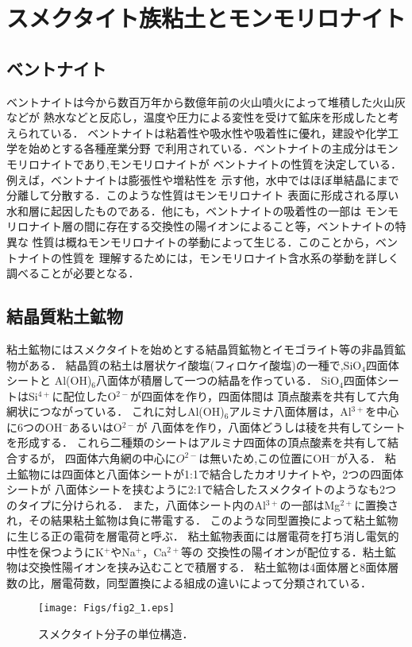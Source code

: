 ﻿\chapter{スメクタイト族粘土とモンモリロナイト}
\section{ベントナイト}
ベントナイトは今から数百万年から数億年前の火山噴火によって堆積した火山灰などが
熱水などと反応し，温度や圧力による変性を受けて鉱床を形成したと考えられている．
ベントナイトは粘着性や吸水性や吸着性に優れ，建設や化学工学を始めとする各種産業分野
で利用されている．ベントナイトの主成分はモンモリロナイトであり,モンモリロナイトが
ベントナイトの性質を決定している．例えば，ベントナイトは膨張性や増粘性を
示す他，水中ではほぼ単結晶にまで分離して分散する．このような性質はモンモリロナイト
表面に形成される厚い水和層に起因したものである．他にも，ベントナイトの吸着性の一部は
モンモリロナイト層の間に存在する交換性の陽イオンによること等，ベントナイトの特異な
性質は概ねモンモリロナイトの挙動によって生じる．このことから，ベントナイトの性質を
理解するためには，モンモリロナイト含水系の挙動を詳しく調べることが必要となる．
\section{結晶質粘土鉱物\cite{Sudo}}
粘土鉱物にはスメクタイトを始めとする結晶質鉱物とイモゴライト等の非晶質鉱物がある．
結晶質の粘土は層状ケイ酸塩(フィロケイ酸塩)の一種で,SiO$_4$四面体シートと
Al(OH)$_6$八面体が積層して一つの結晶を作っている．
SiO$_4$四面体シートはSi$^{4+}$に配位したO$^{2-}$が四面体を作り，四面体間は
頂点酸素を共有して六角網状につながっている．
これに対しAl(OH)$_6$アルミナ八面体層は，Al$^{3+}$を中心に6つのOH$^-$あるいはO$^{2-}$が
八面体を作り，八面体どうしは稜を共有してシートを形成する．
これら二種類のシートはアルミナ四面体の頂点酸素を共有して結合するが，
四面体六角網の中心に$O^{2-}$は無いため,この位置にOH$^-$が入る．
粘土鉱物には四面体と八面体シートが1:1で結合したカオリナイトや，2つの四面体シートが
八面体シートを挟むように2:1で結合したスメクタイトのようなも2つのタイプに分けられる．
また，八面体シート内のAl$^{3+}$の一部はMg$^{2+}$に置換され，その結果粘土鉱物は負に帯電する．
このような同型置換によって粘土鉱物に生じる正の電荷を層電荷と呼ぶ．
粘土鉱物表面には層電荷を打ち消し電気的中性を保つようにK$^+$やNa$^+$，Ca$^{2+}$等の
交換性の陽イオンが配位する．粘土鉱物は交換性陽イオンを挟み込むことで積層する．
粘土鉱物は4面体層と8面体層数の比，層電荷数，同型置換による組成の違いによって分類されている．
\begin{figure}[h]
	\begin{center}
	\texttt{[image: Figs/fig2\_1.eps]} 
	\end{center}
	\caption{
		スメクタイト分子の単位構造．
	} 
	\label{fig:fig2_1}
\end{figure}
